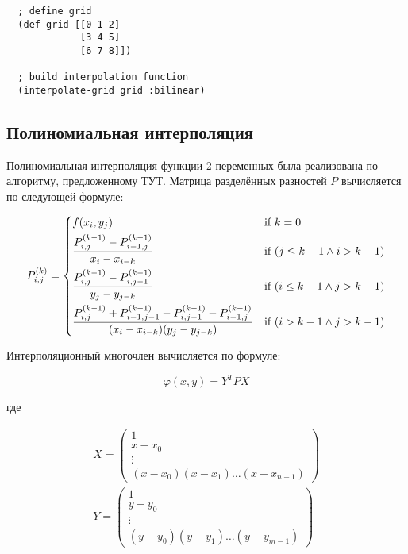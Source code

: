\begin{verbatim}
  ; define grid
  (def grid [[0 1 2]
             [3 4 5]
             [6 7 8]])

  ; build interpolation function
  (interpolate-grid grid :bilinear)
\end{verbatim}



\subsection{Полиномиальная интерполяция}

Полиномиальная интерполяция функции 2 переменных была реализована по алгоритму, предложенному ТУТ. Матрица разделённых разностей $P$ вычисляется по следующей формуле:

\begin{equation}
  P^{(k)}_{i,j} =
  \begin{dcases}
    f(x_i, y_j) & \text{if  } k = 0 \\
    \frac{P^{(k-1)}_{i,j} - P^{(k-1)}_{i-1,j}}{x_i - x_{i-k}} & \text{if  } (j \leq k - 1 \land i > k - 1) \\
    \frac{P^{(k-1)}_{i,j} - P^{(k-1)}_{i,j-1}}{y_j - y_{j-k}} & \text{if  } (i \leq k - 1 \land j > k - 1) \\
    \frac{P^{(k-1)}_{i,j} + P^{(k-1)}_{i-1,j-1} - P^{(k-1)}_{i,j-1} - P^{(k-1)}_{i-1,j}}{(x_i - x_{i-k})(y_j - y_{j-k})} & \text{if  } (i > k-1 \land j > k-1)
  \end{dcases}
\end{equation}

Интерполяционный многочлен вычисляется по формуле:

\begin{equation}
  \varphi(x, y) = Y^T P X
\end{equation}

\noindent где

\begin{equation}
  \begin{gathered}
    X =
    \begin{pmatrix}
      1 \\ x - x_0 \\ \vdots \\ (x - x_0)(x - x_1) \hdots (x - x_{n-1})
    \end{pmatrix}
    \\
    Y =
    \begin{pmatrix}
      1 \\ y - y_0 \\ \vdots \\ (y - y_0)(y - y_1) \hdots (y - y_{m-1})
    \end{pmatrix}
  \end{gathered}
\end{equation}

